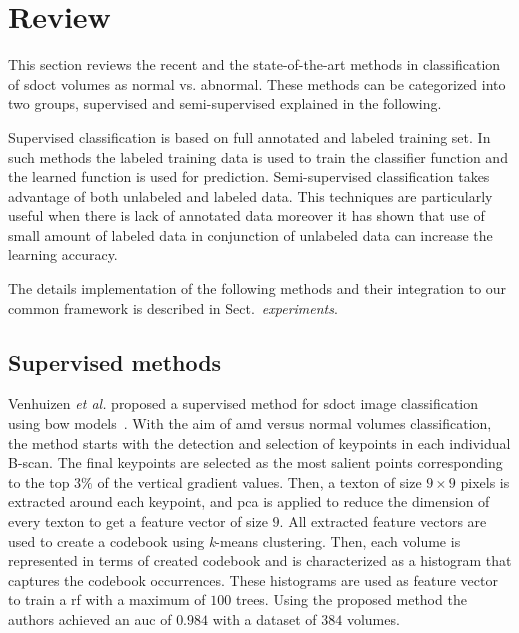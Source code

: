 \graphicspath{ {./content/method/figures/} }
\section{Review}\label{sec:review}
This section reviews the recent and the state-of-the-art methods in classification of \gls{sdoct} volumes as normal vs. abnormal.
These methods can be categorized into two groups, supervised and semi-supervised explained in the following. 

Supervised classification is based on full annotated and labeled training set. 
In such methods the labeled training data is used to train the classifier function and the learned function is used for prediction. 
Semi-supervised classification takes advantage of both unlabeled and labeled data. 
This techniques are particularly useful when there is lack of annotated data moreover it has shown that use of small amount of labeled data in conjunction of unlabeled data can increase the learning accuracy.

The details implementation of the following methods and their integration to our common framework is described in Sect.~\textit{experiments}. 
\subsection{Supervised methods}

Venhuizen \textit{et al.} proposed a supervised method for \gls{sdoct} image classification using \gls{bow} models~\cite{Venhuizen2015}. 
With the aim of \gls{amd} versus normal volumes classification, the method starts with the detection and selection of keypoints in each individual B-scan. %
The final keypoints are selected as the most salient points corresponding to the top $3 \%$ of the vertical gradient values. 
Then, a texton of size $9 \times 9$ pixels is extracted around each keypoint, and \gls{pca} is applied to reduce the dimension of every texton to get a feature vector of size $9$.
All extracted feature vectors are used to create a codebook using \textit{k}-means clustering.
Then, each volume is represented in terms of created codebook and is characterized as a histogram that captures the codebook occurrences.
These histograms are used as feature vector to train a \gls{rf} with a maximum of $100$ trees.
Using the proposed method the authors achieved an \gls{auc} of $0.984$ with a dataset of $384$ volumes. 

